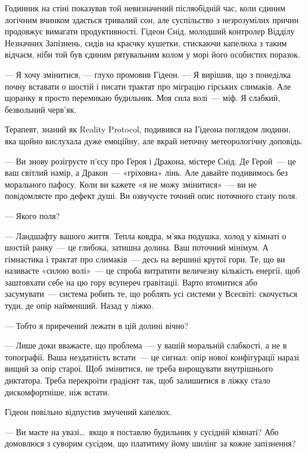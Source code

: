 \documentclass[12pt, a4paper, openany]{book}
\begin{document}
\begin{realitybox}
Годинник на стіні показував той невизначений післяобідній час, коли єдиним логічним вчинком здається тривалий сон, але суспільство з незрозумілих причин продовжує вимагати продуктивності. Гідеон Снід, молодший контролер Відділу Незначних Запізнень, сидів на краєчку кушетки, стискаючи капелюха з таким відчаєм, ніби той був єдиним рятувальним колом у морі його особистих поразок.

--- Я хочу змінитися, --- глухо промовив Гідеон. --- Я вирішив, що з понеділка почну вставати о шостій і писати трактат про міграцію гірських слимаків. Але щоранку я просто перемикаю будильник. Моя сила волі~--- міф. Я слабкий, безвольний черв'як.

\medskip
Терапевт, знаний як Reality Protocol, подивився на Гідеона поглядом людини, яка щойно вислухала дуже емоційну, але вкрай неточну метеорологічну доповідь.

--- Ви знову розігруєте п'єсу про Героя і Дракона, містере Снід. Де Герой~--- це ваш світлий намір, а Дракон~--- «гріховна» лінь. Але давайте подивимось без морального пафосу. Коли ви кажете «я не можу змінитися»~--- ви не повідомляєте про дефект душі. Ви озвучуєте точний опис поточного стану поля.

--- Якого поля?

--- Ландшафту вашого життя. Тепла ковдра, м'яка подушка, холод у кімнаті о шостій ранку~--- це глибока, затишна долина. Ваш поточний мінімум. А гімнастика і трактат про слимаків~--- десь на вершині крутої гори. Те, що ви називаєте «силою волі»~--- це спроба витратити величезну кількість енергії, щоб заштовхати себе на цю гору всупереч гравітації. Варто втомитися або засумувати~--- система робить те, що роблять усі системи у Всесвіті: скочується туди, де опір найменший. Назад у ліжко.

--- Тобто я приречений лежати в цій долині вічно?

--- Лише доки вважаєте, що проблема~--- у вашій моральній слабкості, а не в топографії. Ваша нездатність встати~--- це сигнал: опір нової конфігурації наразі вищий за опір старої. Щоб змінитися, не треба вирощувати внутрішнього диктатора. Треба перекроїти градієнт так, щоб залишитися в ліжку стало дискомфортніше, ніж встати.

\medskip
Гідеон повільно відпустив змучений капелюх.

--- Ви маєте на увазі\ldots\ якщо я поставлю будильник у сусідній кімнаті? Або домовлюся з суворим сусідом, що платитиму йому шилінг за кожне запізнення?


\end{realitybox}
\end{document}
